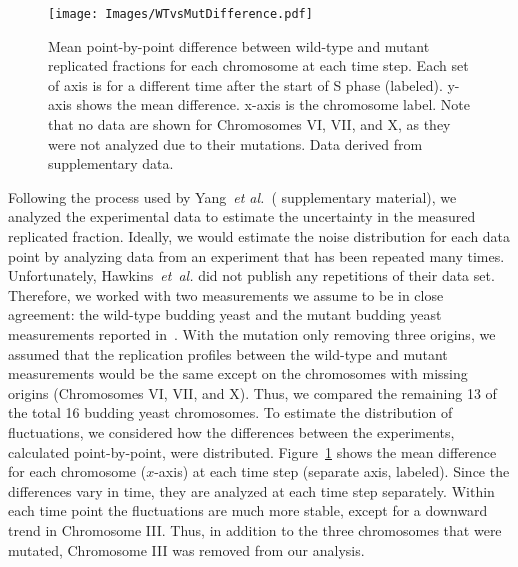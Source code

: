 		\begin{figure}[tbh]
			\begin{center}
				\texttt{[image: Images/WTvsMutDifference.pdf]}
			\end{center}
				\caption[Estimating Experimental Noise: Mean Point-By-Point Difference]{\label{fig:MeanDifference} Mean point-by-point difference between wild-type and mutant replicated fractions for each chromosome at each time step.
					Each set of axis is for a different time after the start of S phase (labeled).
					y-axis shows the mean difference.
					x-axis is the chromosome label.
					Note that no data are shown for Chromosomes VI, VII, and X, as they were not analyzed due to their mutations.
					Data derived from~\cite{StochasticTermination} supplementary data.
				}
		\end{figure}
		
		Following the process used by Yang~\emph{et al.}~(\cite{ScottsPaper} supplementary material), we analyzed the experimental data to estimate the uncertainty in the measured replicated fraction.
		Ideally, we would estimate the noise distribution for each data point by analyzing data from an experiment that has been repeated many times.
		Unfortunately, Hawkins~\emph{et~al.} did not publish any repetitions of their data set.
		Therefore, we worked with two measurements we assume to be in close agreement: the wild-type budding yeast and the mutant budding yeast measurements reported in~\cite{StochasticTemination}.
		With the mutation only removing three origins, we assumed that the replication profiles between the wild-type and mutant measurements would be the same except on the chromosomes with missing origins (Chromosomes VI, VII, and X).
		Thus, we compared the remaining 13 of the total 16 budding yeast chromosomes.
		To estimate the distribution of fluctuations, we considered how the differences between the experiments, calculated point-by-point, were distributed.
		Figure~\ref{fig:MeanDifference} shows the mean difference for each chromosome ($x$-axis) at each time step (separate axis, labeled).
		Since the differences vary in time, they are analyzed at each time step separately.
		Within each time point the fluctuations are much more stable, except for a downward trend in Chromosome III.
		Thus, in addition to the three chromosomes that were mutated, Chromosome III was removed from our analysis.
		
